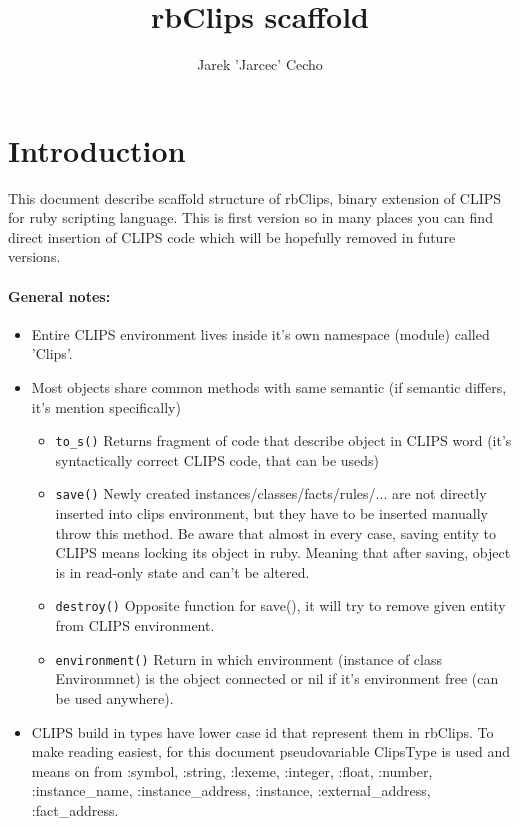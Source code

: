 \documentclass[a4paper,10pt]{article}
\title{rbClips scaffold}
\author{Jarek 'Jarcec' Cecho}
\begin{document}
\maketitle
\tableofcontents

\section{Introduction}
This document describe scaffold structure of rbClips, binary extension of CLIPS for ruby scripting language. This is first version so in many places you can find direct insertion of CLIPS code which will be hopefully removed in future versions.

\paragraph{General notes:}
\begin{itemize}
 \item Entire CLIPS environment lives inside it's own namespace (module) called 'Clips'.
 \item Most objects share common methods with same semantic (if semantic differs, it's mention specifically)
	\begin{itemize}
	 \item \texttt{to\_s()} Returns fragment of code that describe object in CLIPS word (it's syntactically correct CLIPS code, that can be useds)
	 \item \texttt{save()} Newly created instances/classes/facts/rules/... are not directly inserted into clips environment, but they have to be inserted manually throw this method. Be aware that almost in every case, saving entity to CLIPS means locking its object in ruby. Meaning that after saving, object is in read-only state and can't be altered.
	 \item \texttt{destroy()} Opposite function for save(), it will try to remove given entity from CLIPS environment.
	 \item \texttt{environment()} Return in which environment (instance of class Environmnet) is the object connected or nil if it's environment free (can be used anywhere).
	\end{itemize}
 \item CLIPS build in types have lower case id that represent them in rbClips. To make reading easiest, for this document pseudovariable ClipsType is used and means on from :symbol, :string, :lexeme, :integer, :float, :number, :instance\_name, :instance\_address, :instance, :external\_address, :fact\_address.
\end{itemize}
\end{document}
